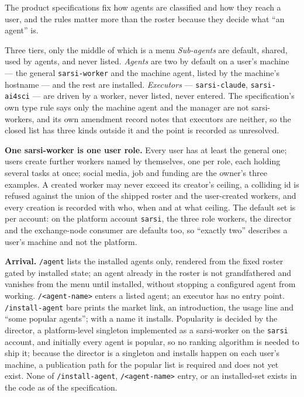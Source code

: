 The product specifications fix how agents are classified and how they reach a user, and the rules matter more than the roster because they decide what ``an agent'' is.

\begin{claimbox}{Three tiers, only the middle of which is a menu}
\emph{Sub-agents} are default, shared, used by agents, and never listed. \emph{Agents} are two by default on a user's machine --- the general \texttt{sarsi-worker} and the machine agent, listed by the machine's hostname --- and the rest are installed. \emph{Executors} --- \texttt{sarsi-claude}, \texttt{sarsi-ai4sci} --- are driven by a worker, never listed, never entered. The specification's own type rule says only the machine agent and the manager are not sarsi-workers, and its own amendment record notes that executors are neither, so the closed list has three kinds outside it and the point is recorded as unresolved.
\end{claimbox}

\textbf{One sarsi-worker is one user role.} Every user has at least the general one; users create further workers named by themselves, one per role, each holding several tasks at once; social media, job and funding are the owner's three examples. A created worker may never exceed its creator's ceiling, a colliding id is refused against the union of the shipped roster and the user-created workers, and every creation is recorded with who, when and at what ceiling. The default set is per account: on the platform account \texttt{sarsi}, the three role workers, the director and the exchange-node consumer are defaults too, so ``exactly two'' describes a user's machine and not the platform.

\textbf{Arrival.} \texttt{/agent} lists the installed agents only, rendered from the fixed roster gated by installed state; an agent already in the roster is not grandfathered and vanishes from the menu until installed, without stopping a configured agent from working. \texttt{/<agent-name>} enters a listed agent; an executor has no entry point. \texttt{/install-agent} bare prints the market link, an introduction, the usage line and ``some popular agents''; with a name it installs. Popularity is decided by the director, a platform-level singleton implemented as a sarsi-worker on the \texttt{sarsi} account, and initially every agent is popular, so no ranking algorithm is needed to ship it; because the director is a singleton and installs happen on each user's machine, a publication path for the popular list is required and does not yet exist. None of \texttt{/install-agent}, \texttt{/<agent-name>} entry, or an installed-set exists in the code as of the specification.

